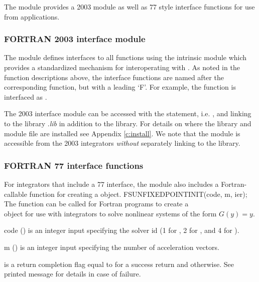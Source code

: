 The {\sunnonlinsolfixedpoint} module provides a {\F} 2003 module as well as
{\F} 77 style interface functions for use from {\F} applications.

\subsubsection*{FORTRAN 2003 interface module}
The  {\F} module defines interfaces to all \newline
{\sunnonlinsolfixedpoint} {\CC} functions using the intrinsic 
module which provides a standardized mechanism for interoperating with {\CC}. As
noted in the {\CC} function descriptions above, the interface functions are
named after the corresponding {\CC} function, but with a leading `F'. For
example, the function  is interfaced as
.

The {\F} 2003 {\sunnonlinsolfixedpoint} interface module can be accessed with the 
statement, i.e. , and linking to the
library \newline
{}.{\em lib} in addition to the
{\CC} library. For details on where the library and module file
 are installed see Appendix \ref{c:install}.
We note that the module is accessible from the {\F} 2003 {\sundials} integrators
\textit{without} separately linking to the
 library.

\subsubsection*{FORTRAN 77 interface functions}
For {\sundials} integrators that include a {\F} 77 interface, the
{\sunnonlinsolfixedpoint} module also includes a Fortran-callable
function for creating a  object.
%
%
{
  FSUNFIXEDPOINTINIT(code, m, ier);
}
{
  The function  can be called for Fortran programs
  to create a\\
   object for use with {\sundials}
  integrators to solve nonlinear systems of the form $G(y) = y$.
}
{
  \begin{args}[code]
  \item[code] ()
    is an integer input specifying the solver id (1 for {\cvode}, 2
    for {\ida}, and 4 for {\arkode}).
  \item[m] ()
    is an integer input specifying the number of acceleration vectors.
  \end{args}
}
{
   is a return completion flag equal to  for a success
  return and  otherwise. See printed message for details in case
  of failure.
}
{}


